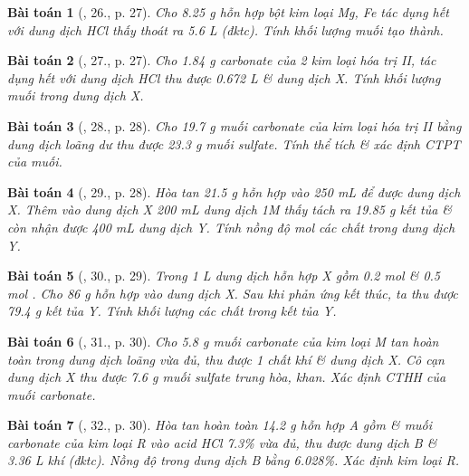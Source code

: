 \documentclass{article}
\newtheorem{baitoan}{Bài toán}
\begin{document}
\begin{baitoan}[\cite{An_350_BT_Hoa_Hoc_9}, 26., p. 27]
	Cho \emph{8.25 g} hỗn hợp bột kim loại \emph{Mg, Fe} tác dụng hết với dung dịch \emph{HCl} thấy thoát ra \emph{5.6 L } (đktc). Tính khối lượng muối tạo thành.
\end{baitoan}

\begin{baitoan}[\cite{An_350_BT_Hoa_Hoc_9}, 27., p. 27]
	Cho \emph{1.84 g} carbonate của 2 kim loại hóa trị II, tác dụng hết với dung dịch \emph{HCl} thu được \emph{0.672 L } \& dung dịch X. Tính khối lượng muối trong dung dịch X.
\end{baitoan}

\begin{baitoan}[\cite{An_350_BT_Hoa_Hoc_9}, 28., p. 28]
	Cho \emph{19.7 g} muối carbonate của kim loại hóa trị II bằng dung dịch \emph{} loãng dư thu được \emph{23.3 g} muối sulfate. Tính thể tích \emph{} \& xác định CTPT của muối.
\end{baitoan}

\begin{baitoan}[\cite{An_350_BT_Hoa_Hoc_9}, 29., p. 28]
	Hòa tan \emph{21.5 g} hỗn hợp \emph{} vào \emph{250 mL } để được dung dịch X. Thêm vào dung dịch X \emph{200 mL} dung dịch \emph{ 1M} thấy tách ra \emph{19.85 g} kết tủa \& còn nhận được \emph{400 mL} dung dịch Y. Tính nồng độ mol các chất trong dung dịch Y.
\end{baitoan}

\begin{baitoan}[\cite{An_350_BT_Hoa_Hoc_9}, 30., p. 29]
	Trong \emph{1 L} dung dịch hỗn hợp X gồm \emph{0.2 mol } \& \emph{0.5 mol }. Cho \emph{86 g} hỗn hợp \emph{} vào dung dịch X. Sau khi phản ứng kết thúc, ta thu được \emph{79.4 g} kết tủa Y. Tính khối lượng các chất trong kết tủa Y.
\end{baitoan}

\begin{baitoan}[\cite{An_350_BT_Hoa_Hoc_9}, 31., p. 30]
	Cho \emph{5.8 g} muối carbonate \emph{} của kim loại M tan hoàn toàn trong dung dịch \emph{} loãng vừa đủ, thu được 1 chất khí \& dung dịch X. Cô cạn dung dịch X thu được \emph{7.6 g} muối sulfate trung hòa, khan. Xác định CTHH của muối carbonate.
\end{baitoan}

\begin{baitoan}[\cite{An_350_BT_Hoa_Hoc_9}, 32., p. 30]
	Hòa tan hoàn toàn \emph{14.2 g} hỗn hợp A gồm \emph{} \& muối carbonate của kim loại R vào acid \emph{HCl 7.3\%} vừa đủ, thu được dung dịch B \& \emph{3.36 L} khí \emph{} (đktc). Nồng độ \emph{} trong dung dịch B bằng \emph{6.028\%}. Xác định kim loại R.
\end{baitoan}
\end{document}
